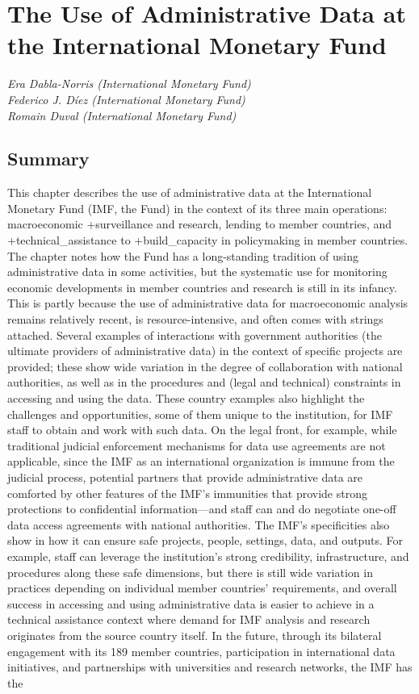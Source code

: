 \documentclass[
]{WileySix}
\begin{document}
\hypertarget{imf}{%
\section{The Use of Administrative Data at the International Monetary Fund}\label{imf}}

\emph{Era Dabla-Norris (International Monetary Fund)}\\
\emph{Federico J. Díez (International Monetary Fund)}\\
\emph{Romain Duval (International Monetary Fund)}

\hypertarget{summary-9}{%
\subsection{Summary}\label{summary-9}}

This chapter describes the use of administrative data at the International Monetary Fund (IMF, the Fund) in the context of its three main operations: macroeconomic +surveillance\textbar{} and research, lending to member countries, and +technical\_assistance\textbar{} to +build\_capacity\textbar{} in policymaking in member countries. The chapter notes how the Fund has a long-standing tradition of using administrative data in some activities, but the systematic use for monitoring economic developments in member countries and research is still in its infancy. This is partly because the use of administrative data for macroeconomic analysis remains relatively recent, is resource-intensive, and often comes with strings attached. Several examples of interactions with government authorities (the ultimate providers of administrative data) in the context of specific projects are provided; these show wide variation in the degree of collaboration with national authorities, as well as in the procedures and (legal and technical) constraints in accessing and using the data. These country examples also highlight the challenges and opportunities, some of them unique to the institution, for IMF staff to obtain and work with such data. On the legal front, for example, while traditional judicial enforcement mechanisms for data use agreements are not applicable, since the IMF as an international organization is immune from the judicial process, potential partners that provide administrative data are comforted by other features of the IMF's immunities that provide strong protections to confidential information---and staff can and do negotiate one-off data access agreements with national authorities. The IMF's specificities also show in how it can ensure safe projects, people, settings, data, and outputs. For example, staff can leverage the institution's strong credibility, infrastructure, and procedures along these safe dimensions, but there is still wide variation in practices depending on individual member countries' requirements, and overall success in accessing and using administrative data is easier to achieve in a technical assistance context where demand for IMF analysis and research originates from the source country itself. In the future, through its bilateral engagement with its 189 member countries, participation in international data initiatives, and partnerships with universities and research networks, the IMF has the 
\end{document}
